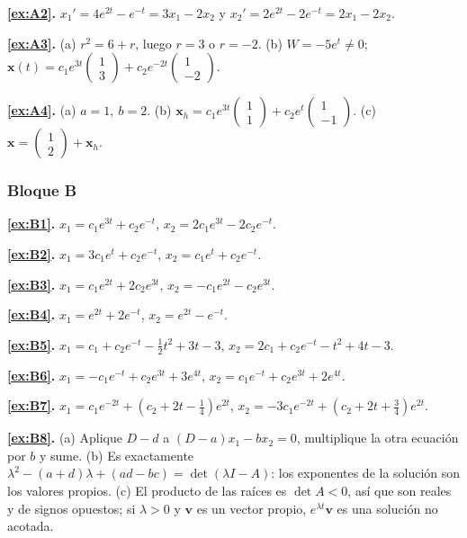 \noindent\textbf{\ref{ex:A2}.} $x_1' = 4e^{2t} - e^{-t} = 3x_1 - 2x_2$ \; y \; $x_2' = 2e^{2t} - 2e^{-t} = 2x_1 - 2x_2$.

\noindent\textbf{\ref{ex:A3}.} (a) $r^2 = 6 + r$, luego $r = 3$ o $r = -2$. (b) $W = -5e^{t} \neq 0$; $\mathbf{x}(t) = c_1 e^{3t}\begin{pmatrix}1\\3\end{pmatrix} + c_2 e^{-2t}\begin{pmatrix}1\\-2\end{pmatrix}$.

\noindent\textbf{\ref{ex:A4}.} (a) $a = 1,\ b = 2$. (b) $\mathbf{x}_h = c_1 e^{3t}\begin{pmatrix}1\\1\end{pmatrix} + c_2 e^{t}\begin{pmatrix}1\\-1\end{pmatrix}$. (c) $\mathbf{x} = \begin{pmatrix}1\\2\end{pmatrix} + \mathbf{x}_h$.

\subsubsection*{Bloque B}
\noindent\textbf{\ref{ex:B1}.} $x_1 = c_1e^{3t} + c_2e^{-t}$, \; $x_2 = 2c_1e^{3t} - 2c_2e^{-t}$.

\noindent\textbf{\ref{ex:B2}.} $x_1 = 3c_1e^{t} + c_2e^{-t}$, \; $x_2 = c_1e^{t} + c_2e^{-t}$.

\noindent\textbf{\ref{ex:B3}.} $x_1 = c_1e^{2t} + 2c_2e^{3t}$, \; $x_2 = -c_1e^{2t} - c_2e^{3t}$.

\noindent\textbf{\ref{ex:B4}.} $x_1 = e^{2t} + 2e^{-t}$, \; $x_2 = e^{2t} - e^{-t}$.

\noindent\textbf{\ref{ex:B5}.} $x_1 = c_1 + c_2e^{-t} - \tfrac12 t^2 + 3t - 3$, \; $x_2 = 2c_1 + c_2e^{-t} - t^2 + 4t - 3$.

\noindent\textbf{\ref{ex:B6}.} $x_1 = -c_1e^{-t} + c_2e^{3t} + 3e^{4t}$, \; $x_2 = c_1e^{-t} + c_2e^{3t} + 2e^{4t}$.

\noindent\textbf{\ref{ex:B7}.} $x_1 = c_1e^{-2t} + \left(c_2 + 2t - \tfrac14\right)e^{2t}$, \; $x_2 = -3c_1e^{-2t} + \left(c_2 + 2t + \tfrac34\right)e^{2t}$.

\noindent\textbf{\ref{ex:B8}.} (a) Aplique $D - d$ a $(D-a)x_1 - b x_2 = 0$, multiplique la otra ecuación por $b$ y sume. (b) Es exactamente $\lambda^2 - (a+d)\lambda + (ad - bc) = \det(\lambda I - A)$: los exponentes de la solución son los valores propios. (c) El producto de las raíces es $\det A < 0$, así que son reales y de signos opuestos; si $\lambda > 0$ y $\mathbf{v}$ es un vector propio, $e^{\lambda t}\mathbf{v}$ es una solución no acotada.

